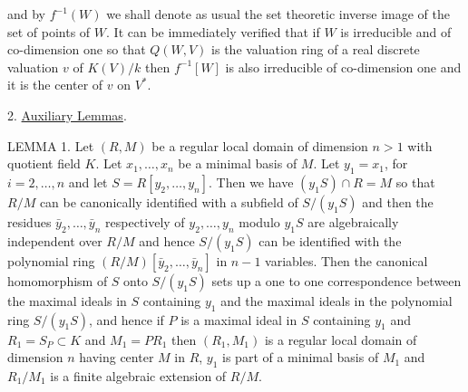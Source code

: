 
and by $f^{-1}(W)$ we shall denote as usual the set theoretic inverse image of the set of points of $W$. It can be immediately verified that if $W$ is irreducible and of co-dimension one so that $Q(W,V)$ is the valuation ring of a real discrete valuation $v$ of $K(V)/k$ then $f^{-1}[W]$ is also irreducible of co-dimension one and it is the center of $v$ on $V^*$.

2. \uline{Auxiliary Lemmas}.

LEMMA 1. Let $(R,M)$ be a regular local domain of dimension $n>1$ with quotient field $K$. Let $x_1,\ldots,x_n$ be a minimal basis of $M$. Let $y_1=x_1$,   for $i=2,\ldots,n$ and let $S=R[y_2,\ldots,y_n]$. Then we have $(y_1S)\cap R=M$ so that $R/M$ can be canonically identified with a subfield of $S/(y_1S)$ and then the residues $\bar y_2,\ldots,\bar y_n$ respectively of $y_2,\ldots,y_n$ modulo $y_1S$ are algebraically independent over $R/M$ and hence $S/(y_1S)$ can be identified with the polynomial ring $(R/M)[\bar y_2,\ldots,\bar y_n]$ in $n-1$ variables. Then the canonical homomorphism of $S$ onto $S/(y_1S)$ sets up a one to one correspondence between the maximal ideals in $S$ containing $y_1$ and the maximal ideals in the polynomial ring $S/(y_1S)$, and hence if $P$ is a maximal ideal in $S$ containing $y_1$ and $R_1=S_P\subset K$ and $M_1=PR_1$ then $(R_1,M_1)$ is a regular local domain of dimension $n$ having center $M$ in $R$, $y_1$ is part of a minimal basis of $M_1$ and $R_1/M_1$ is a finite algebraic extension of $R/M$.
